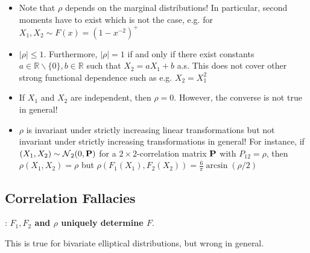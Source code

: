 \begin{itemize}[leftmargin=*]
    \item Note that $\rho$ depends on the marginal distributions! In particular, second moments have to exist which is not the case, e.g. for $X_{1}, X_{2} \sim F(x)=\left(1-x^{-2}\right)^{+}$
    \item $|\rho| \leq 1$. Furthermore, $|\rho|=1$ if and only if there exist constants $a \in \mathbb{R} \backslash\{0\}, b \in \mathbb{R}$ such that $X_{2}=a X_{1}+b$ a.s. This does not cover other strong functional dependence such as e.g. $X_{2}=X_{1}^{2}$
    \item If $X_{1}$ and $X_{2}$ are independent, then $\rho=0$. However, the converse is not true in general!
    \item $\rho$ is invariant under strictly increasing linear transformations but not invariant under strictly increasing transformations in general! For instance, if $\left(X_{1}, X_{2}\right) \sim \operatorname{\mathcal{N}}_{2}(0, \boldsymbol{\mathbf{P}})$ for a $2 \times 2$-correlation matrix $\boldsymbol{\mathbf{P}}$ with $P_{12}=\rho$, then
$
\rho\left(X_{1}, X_{2}\right)=\rho$ but $\rho\left(F_{1}\left(X_{1}\right), F_{2}\left(X_{2}\right)\right)=\frac{6}{\pi} \arcsin (\rho / 2)
$
\end{itemize}






\subsection*{Correlation Fallacies}
: \textbf{$F_{1}, F_{2}$ and $\rho$ uniquely determine $F$}.

This is true for bivariate elliptical distributions, but wrong in general.


